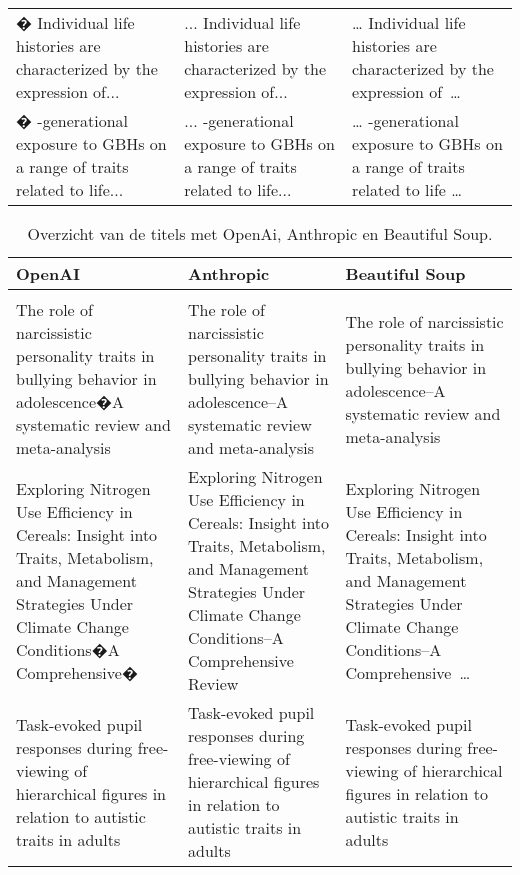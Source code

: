 \begin{table}[h!]
\begin{adjustbox}{width=1.2\textwidth,center}
\begin{tabularx}{\textwidth}{|X|X|X|}
        � Individual life histories are characterized by the expression of... & ... Individual life histories are characterized by the expression of... & … Individual life histories are characterized by the expression of …\\
        � -generational exposure to GBHs on a range of traits related to life... & ... -generational exposure to GBHs on a range of traits related to life... & … -generational exposure to GBHs on a range of traits related to life …\\
        \hline
    \end{tabularx}
\end{adjustbox}
    \label{table:llmTekst}
\end{table}
\begin{table}[h!]
    \tiny
    \caption{Overzicht van de titels met OpenAi, Anthropic en Beautiful Soup.}
    \centering
    \begin{adjustbox}{width=1.2\textwidth,center}
    \begin{tabularx}{\textwidth}{|X|X|X|} 
        \hline
        \rowcolor{lightgray}
        OpenAI & Anthropic & Beautiful Soup \\ 
        \hline
        \rowcolor{lightgray}
        \multicolumn{3}{|X|}{Titel}\\ 
        \hline
        The role of narcissistic personality traits in bullying behavior in adolescence�A systematic review and meta-analysis & The role of narcissistic personality traits in bullying behavior in adolescence–A systematic review and meta-analysis & The role of narcissistic personality traits in bullying behavior in adolescence–A systematic review and meta-analysis\\ 
        Exploring Nitrogen Use Efficiency in Cereals: Insight into Traits, Metabolism, and Management Strategies Under Climate Change Conditions�A Comprehensive� & Exploring Nitrogen Use Efficiency in Cereals: Insight into Traits, Metabolism, and Management Strategies Under Climate Change Conditions–A Comprehensive Review & Exploring Nitrogen Use Efficiency in Cereals: Insight into Traits, Metabolism, and Management Strategies Under Climate Change Conditions–A Comprehensive …\\
        Task-evoked pupil responses during free-viewing of hierarchical figures in relation to autistic traits in adults & Task-evoked pupil responses during free-viewing of hierarchical figures in relation to autistic traits in adults & Task-evoked pupil responses during free-viewing of hierarchical figures in relation to autistic traits in adults\\

\end{tabularx}
\end{adjustbox}
\end{table}
